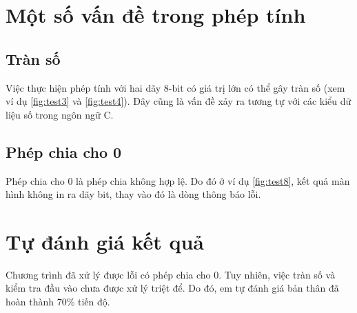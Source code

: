 \section{Một số vấn đề trong phép tính}

\vspace{-0.4cm}
\subsection{Tràn số}

\vspace{-0.3cm}
Việc thực hiện phép tính với hai dãy 8-bit có giá trị lớn có thể gây tràn số (xem ví dụ \ref{fig:test3} và \ref{fig:test4}). Đây cũng là vấn đề xảy ra tương tự với các kiểu dữ liệu số trong ngôn ngữ C.

\vspace{-0.4cm}
\subsection{Phép chia cho 0}

\vspace{-0.3cm}
Phép chia cho 0 là phép chia không hợp lệ. Do đó ở ví dụ \ref{fig:test8}, kết quả màn hình không in ra dãy bit, thay vào đó là dòng thông báo lỗi.

\section{Tự đánh giá kết quả}

\vspace{-0.3cm}
Chương trình đã xử lý được lỗi có phép chia cho 0. Tuy nhiên, việc tràn số và kiểm tra đầu vào chưa được xử lý triệt để. Do đó, em tự đánh giá bản thân đã hoàn thành 70\% tiến độ.